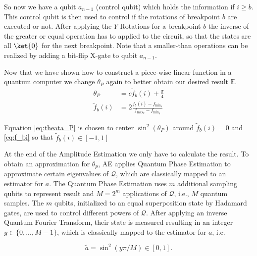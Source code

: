 \documentclass[../../main.tex]{subfiles}
\begin{document}
So now we have a qubit $a_{n-1}$ (control qubit) which holds the information if $i\geq b$. This control qubit is then used to control if the rotations of breakpoint $b$ are executed or not. After applying the $Y$ Rotations for a breakpoint $b$ the inverse of the greater or equal operation has to applied to the circuit, so that the states are all $\ket{0}$ for the next breakpoint. 
Note that a smaller-than operations can be realized by adding a bit-flip X-gate to qubit $a_{n-1}$.

Now that we have shown how to construct a piece-wise linear function in a quantum computer we change $\theta_P$ again to better obtain our desired result $\mathbb{E}$.
\begin{align}
    \theta_P &= c\tilde{f}_b(i)+\frac{\pi}{4}\label{eq:theata_P} \\
    \tilde{f}_b(i) &= 2 \frac{f_b(i)-f_{\text{min}_b}}{f_{\text{max}_b}-f_{\text{min}_b}}\label{eq:f_bi}
\end{align}

Equation \ref{eq:theata_P} is chosen to center $ \sin^2(\theta_P) $ around $\tilde{f}_b(i) = 0$ and \ref{eq:f_bi} so that $\tilde{f}_b(i) \in [-1,1] $

At the end of the Amplitude Estimation we only have to calculate the result.
To obtain an approximation for $\theta_p$, AE applies Quantum Phase Estimation to approximate certain eigenvalues of $\mathcal{Q}$, which are classically mapped to an estimator for $a$. The Quantum Phase Estimation uses $m$ additional sampling qubits to represent result and $M = 2^m$ applications of $\mathcal{Q}$, i.e., $M$ quantum samples. 
The $m$ qubits, initialized to an equal superposition state by Hadamard gates, are used to control different powers of $\mathcal{Q}$. After applying an inverse Quantum Fourier Transform, their state is measured resulting in an integer $y \in \{0, ..., M - 1\}$, which is classically mapped to the estimator for $a$, i.e.

\begin{equation}
    \tilde{a} = \sin^2(y \pi / M) \in [0,1] \label{eq:estimate_a}.
\end{equation}

\biblio
\end{document}
